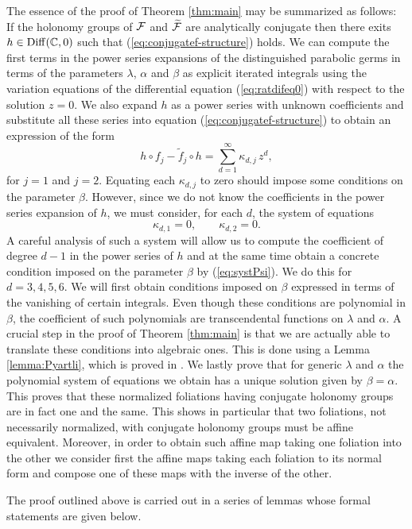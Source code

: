 The essence of the proof of Theorem \ref{thm:main} may be summarized as follows: If the holonomy groups of $\mathcal{F}$ and $\widetilde{\mathcal{F}}$ are analytically conjugate then there exits $h\in\operatorname{Diff}(\mathbb{C},0)$ such that (\ref{eq:conjugatef-structure}) holds. We can compute the first terms in the power series expansions of the distinguished parabolic germs in terms of the parameters $\lambda$, $\alpha$ and $\beta$ as explicit iterated integrals using the variation equations of the differential equation (\ref{eq:ratdifeq0}) with respect to the solution $z=0$. We also expand $h$ as a power series with unknown coefficients and substitute all these series into equation (\ref{eq:conjugatef-structure}) to obtain an expression of the form
\[ h\circ f_j-\tilde{f}_j\circ h=\sum_{d=1}^{\infty}\kappa_{d,j}\,z^d, \]
for $j=1$ and $j=2$. Equating each $\kappa_{d,j}$ to zero should impose some conditions on the parameter $\beta$. However, since we do not know the coefficients in the power series expansion of $h$, we must consider, for each $d$, the system of equations
\begin{equation}\label{eq:systPsi}
 \kappa_{d,1}=0, \qquad \kappa_{d,2}=0.
\end{equation} 
A careful analysis of such a system will allow us to compute the coefficient of degree $d-1$ in the power series of $h$ and at the same time obtain a concrete condition imposed on the parameter $\beta$ by (\ref{eq:systPsi}). We do this for $d=3,4,5,6$. We will first obtain  conditions imposed on $\beta$ expressed in terms of the vanishing of certain integrals. Even though these conditions are polynomial in $\beta$, the coefficient of such polynomials are transcendental functions on $\lambda$ and $\alpha$. A crucial step in the proof of Theorem \ref{thm:main} is that we are actually able to translate these conditions into algebraic ones. This is done using a Lemma \ref{lemma:Pyartli}, which is proved in \cite{Pyartli2000}. We lastly prove that for generic $\lambda$ and $\alpha$ the polynomial system of equations we obtain has a unique solution given by $\beta=\alpha$. This proves that these normalized foliations having conjugate holonomy groups are in fact one and the same. This shows in particular that two foliations, not necessarily normalized, with conjugate holonomy groups must be affine equivalent. Moreover, in order to obtain such affine map taking one foliation into the other we consider first the affine maps taking each foliation to its normal form and compose one of these maps with the inverse of the other.

The proof outlined above is carried out in a series of lemmas whose formal statements are given below.





